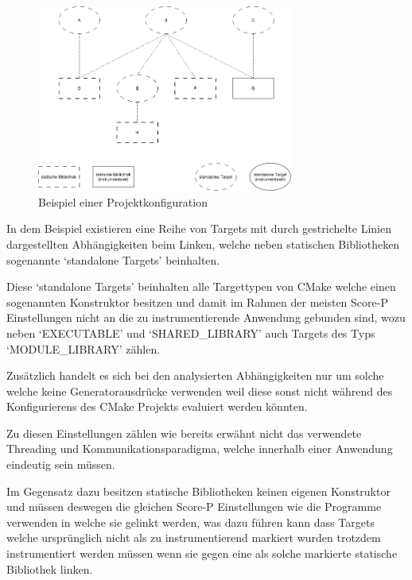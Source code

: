 \documentclass[german,proseminar,hyperref,utf8]{zihpub}
\begin{document}
    \begin{figure}[ht]
        \begin{center}
            \includegraphics[width=0.75\textwidth]{analysis_before.drawio.png}
            \caption{Beispiel einer Projektkonfiguration}
            \label{fig:analysis_example}
        \end{center}
    \end{figure}

    In dem Beispiel existieren eine Reihe von Targets mit durch gestrichelte Linien dargestellten
    Abhängigkeiten beim Linken, welche neben statischen Bibliotheken sogenannte `standalone Targets'
    beinhalten.

    Diese `standalone Targets' beinhalten alle Targettypen von CMake welche einen sogenannten
    Konstruktor besitzen und damit im Rahmen der meisten Score-P Einstellungen nicht an die
    zu instrumentierende Anwendung gebunden sind, wozu neben `EXECUTABLE' und `SHARED\_LIBRARY'
    auch Targets des Typs `MODULE\_LIBRARY' zählen.

    Zusätzlich handelt es sich bei den analysierten Abhängigkeiten nur um solche welche keine
    Generatorausdrücke verwenden weil diese sonst nicht während des Konfigurierens des CMake
    Projekts evaluiert werden könnten.

    Zu diesen Einstellungen zählen wie bereits erwähnt nicht das verwendete Threading und
    Kommunikationsparadigma, welche innerhalb einer Anwendung eindeutig sein müssen.

    Im Gegensatz dazu besitzen statische Bibliotheken keinen eigenen Konstruktor und müssen deswegen
    die gleichen Score-P Einstellungen wie die Programme verwenden in welche sie gelinkt werden, was
    dazu führen kann dass Targets welche ursprünglich nicht als zu instrumentierend markiert wurden
    trotzdem instrumentiert werden müssen wenn sie gegen eine als solche markierte statische
    Bibliothek linken.
\end{document}
